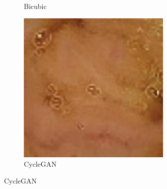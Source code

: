 \begin{figure}[H]
\begin{subfigure}[b]{0.275\textwidth}
    \caption{Bicubic}
  \end{subfigure}
  \begin{subfigure}[b]{0.275\textwidth}
    \includegraphics[width=\textwidth]{Chapter7/cycle_mse_9.jpg}
    \caption{CycleGAN}
  \end{subfigure}
  

\end{figure}
